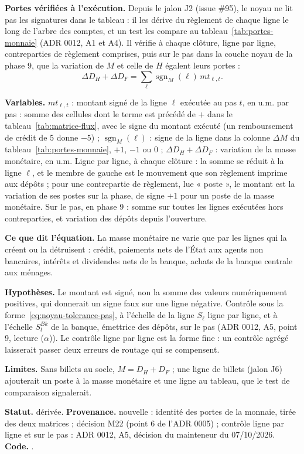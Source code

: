 \documentclass[11pt,a4paper]{article}
\newcommand{\variables}{\par\noindent\textbf{Variables.} }
\newcommand{\sens}{\par\noindent\textbf{Ce que dit l'équation.} }
\newcommand{\hyp}{\par\noindent\textbf{Hypothèses.} }
\newcommand{\limites}{\par\noindent\textbf{Limites.} }
\DeclareMathOperator{\sgn}{sgn}
\newcommand{\code}[1]{\texttt{\detokenize{#1}}}
\newcommand{\tracabilite}[3]{\par\smallskip\noindent\textbf{Statut.} #1. \textbf{Provenance.} #2. \textbf{Code.} \code{#3}.}
\begin{document}
\textbf{Portes vérifiées à l'exécution.} Depuis le jalon J2 (issue \#95), le noyau ne lit pas les signatures dans le tableau : il les dérive du règlement de chaque ligne le long de l'arbre des comptes, et un test les compare au tableau~\ref{tab:portes-monnaie} (ADR 0012, A1 et A4). Il vérifie à chaque clôture, ligne par ligne, contreparties de règlement comprises, puis sur le pas dans la couche noyau de la phase 9, que la variation de $M$ et celle de $H$ égalent leurs portes :
\begin{equation}\label{eq:noyau-variation-monnaie}
\Delta D_H + \Delta D_F = \sum_{\ell} \sgn_M(\ell)\, \mathit{mt}_{\ell,t} .
\end{equation}
\begin{lecture}
\variables $\mathit{mt}_{\ell,t}$ : montant signé de la ligne $\ell$ exécutée au pas $t$, en u.m. par pas : somme des cellules dont le terme est précédé de $+$ dans le tableau~\ref{tab:matrice-flux}, avec le signe du montant exécuté (un remboursement de crédit de 5 donne $-5$) ; $\sgn_M(\ell)$ : signe de la ligne dans la colonne $\Delta M$ du tableau~\ref{tab:portes-monnaie}, $+1$, $-1$ ou 0 ; $\Delta D_H + \Delta D_F$ : variation de la masse monétaire, en u.m. Ligne par ligne, à chaque clôture : la somme se réduit à la ligne $\ell$, et le membre de gauche est le mouvement que son règlement imprime aux dépôts ; pour une contrepartie de règlement, lue « poste », le montant est la variation de ses postes sur la phase, de signe $+1$ pour un poste de la masse monétaire. Sur le pas, en phase 9 : somme sur toutes les lignes exécutées hors contreparties, et variation des dépôts depuis l'ouverture.
\sens La masse monétaire ne varie que par les lignes qui la créent ou la détruisent : crédit, paiements nets de l'État aux agents non bancaires, intérêts et dividendes nets de la banque, achats de la banque centrale aux ménages.
\hyp Le montant est signé, non la somme des valeurs numériquement positives, qui donnerait un signe faux sur une ligne négative. Contrôle sous la forme~\eqref{eq:noyau-tolerance-pas}, à l'échelle de la ligne $S_\ell$ ligne par ligne, et à l'échelle $S^{\mathit{Bk}}_t$ de la banque, émettrice des dépôts, sur le pas (ADR 0012, A5, point 9, lecture ($\alpha$)). Le contrôle ligne par ligne est la forme fine : un contrôle agrégé laisserait passer deux erreurs de routage qui se compensent.
\limites Sans billets au socle, $M = D_H + D_F$ ; une ligne de billets (jalon J6) ajouterait un poste à la masse monétaire et une ligne au tableau, que le test de comparaison signalerait.
\tracabilite{dérivée}{nouvelle : identité des portes de la monnaie, tirée des deux matrices ; décision M22 (point 6 de l'ADR 0005) ; contrôle ligne par ligne et sur le pas : ADR 0012, A5, décision du mainteneur du 07/10/2026}{nations.noyau.identites.residu_variation_monnaie}
\end{lecture}
\end{document}
